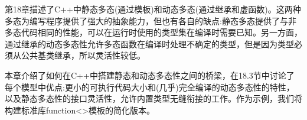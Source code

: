 第18章描述了C++中静态多态(通过模板)和动态多态(通过继承和虚函数)。这两种多态为编写程序提供了强大的抽象能力，但也有各自的缺点:静态多态提供了与非多态代码相同的性能，可以在运行时使用的类型集在编译时需要已知。另一方面，通过继承的动态多态性允许多态函数在编译时处理不确定的类型，但是因为类型必须从公共基类继承，所以灵活性较低。

本章介绍了如何在C++中搭建静态和动态多态性之间的桥梁，在18.3节中讨论了每个模型中优点:更小的可执行代码大小和(几乎)完全编译的动态多态性的特性，以及静态多态性的接口灵活性，允许内置类型无缝衔接的工作。作为示例，我们将构建标准库function<>模板的简化版本。